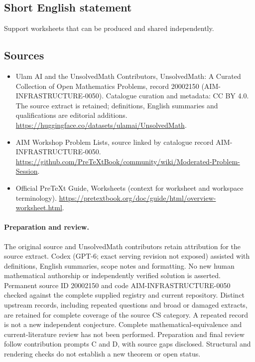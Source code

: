 \documentclass[11pt]{article}
\begin{document}
\subsection{Short English statement}
Support worksheets that can be produced and shared independently.
\subsection{Sources}
\begin{itemize}
\item[\hypertarget{source:20002150:1}{S1}] Ulam AI and the UnsolvedMath Contributors, UnsolvedMath: A Curated Collection of Open Mathematics Problems, record 20002150 (AIM-INFRASTRUCTURE-0050). Catalogue curation and metadata: CC BY 4.0. The source extract is retained; definitions, English summaries and qualifications are editorial additions.
\url{https://huggingface.co/datasets/ulamai/UnsolvedMath}.
\item[\hypertarget{source:20002150:2}{S2}] AIM Workshop Problem Lists, source linked by catalogue record AIM-INFRASTRUCTURE-0050.
\url{https://github.com/PreTeXtBook/community/wiki/Moderated-Problem-Session}.
\item[\hypertarget{source:20002150:3}{S3}] Official PreTeXt Guide, Worksheets (context for worksheet and workspace terminology).
\url{https://pretextbook.org/doc/guide/html/overview-worksheet.html}.
\end{itemize}
\paragraph{Preparation and review.}
The original source and UnsolvedMath contributors retain attribution for the source extract. Codex (GPT-6; exact serving revision not exposed) assisted with definitions, English summaries, scope notes and formatting. No new human mathematical authorship or independently verified solution is asserted. Permanent source ID 20002150 and code AIM-INFRASTRUCTURE-0050 checked against the complete supplied registry and current repository. Distinct upstream records, including repeated questions and broad or damaged extracts, are retained for complete coverage of the source CS category. A repeated record is not a new independent conjecture. Complete mathematical-equivalence and current-literature review has not been performed. Preparation and final review follow contribution prompts C and D, with source gaps disclosed. Structural and rendering checks do not establish a new theorem or open status.
\label{end:20002150}
\end{document}
